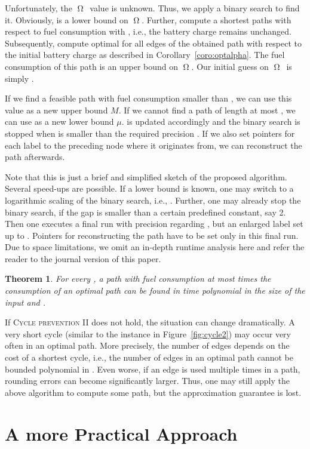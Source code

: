 \documentclass[a4paper]{scrartcl}
\newcommand{\OPT}{\ensuremath{\operatorname{\Omega}}}
\newcommand{\UB}{\ensuremath{M}}
\newcommand{\LB}{\ensuremath{\mu}}
\newtheorem{theorem}{Theorem}
\begin{document}
Unfortunately, the \OPT\ value is unknown. Thus, we apply a binary search to find it. Obviously,  is a lower bound on \OPT. Further, compute a shortest paths with respect to fuel consumption with , i.e., the battery charge remains unchanged. Subsequently, compute optimal  for all edges of the obtained path with respect to the initial battery charge as described in Corollary~\ref{coro:optalpha}. The fuel consumption of this path is an upper bound  on \OPT. Our initial guess on \OPT\ is simply . 

If we find a feasible path with fuel consumption smaller than , we can use this value as a new upper bound \UB. If we cannot find a path of length at most , we can use  as a new lower bound \LB.  is updated accordingly and the binary search is stopped when  is smaller than the required precision . If we also set pointers for each label to the preceding node where it originates from, we can reconstruct the path afterwards.

Note that this is just a brief and simplified sketch of the proposed algorithm. Several speed-ups are possible. If a lower bound  is known, one may switch to a logarithmic scaling of the binary search, i.e., . Further, one may already stop the binary search, if the gap is smaller than a certain predefined constant, say 2. Then one executes a final run with precision regarding , but an enlarged label set up to . Pointers for reconstructing the path have to be set only in this final run. Due to space limitations, we omit an in-depth runtime analysis here and refer the reader to the journal version of this paper.

\begin{theorem}
 For every , a path with fuel consumption at most  times the consumption of an optimal path can be found in time polynomial in the size of the input and .
\end{theorem}

If \textsc{Cycle prevention II} does not hold, the situation can change dramatically. A very short cycle (similar to the instance in Figure~\ref{fig:cycle2}) may occur very often in an optimal path. More precisely, the number of edges depends on the cost of a shortest cycle, i.e., the number of edges in an optimal path cannot be bounded polynomial in . Even worse, if an edge is used multiple times in a path, rounding errors can become significantly larger. Thus, one may still apply the above algorithm to compute some path, but the approximation guarantee is lost.  


\section{A more Practical Approach}
\end{document}

